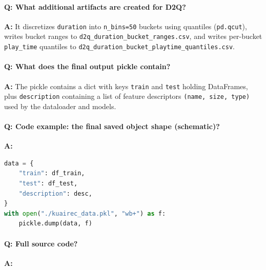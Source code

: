 \documentclass[11pt]{article}
\begin{document}
\paragraph{Q: What additional artifacts are created for D2Q?}
\textbf{A:} It discretizes \lstinline|duration| into \lstinline|n_bins=50| buckets using quantiles (\lstinline|pd.qcut|), writes bucket ranges to \lstinline|d2q_duration_bucket_ranges.csv|, and writes per-bucket \lstinline|play_time| quantiles to \lstinline|d2q_duration_bucket_playtime_quantiles.csv|.

\paragraph{Q: What does the final output pickle contain?}
\textbf{A:} The pickle contains a dict with keys \lstinline|train| and \lstinline|test| holding DataFrames, plus \lstinline|description| containing a list of feature descriptors \lstinline|(name, size, type)| used by the dataloader and models.

\paragraph{Q: Code example: the final saved object shape (schematic)?}
\textbf{A:}
\begin{lstlisting}[language=Python]
data = {
    "train": df_train,
    "test": df_test,
    "description": desc,
}
with open("./kuairec_data.pkl", "wb+") as f:
    pickle.dump(data, f)
\end{lstlisting}

\paragraph{Q: Full source code?}
\textbf{A:}

\end{document}
